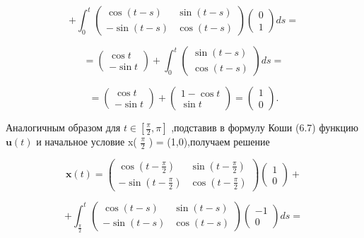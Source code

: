 \documentclass[8pt]{extarticle}
\begin{document}
\[
+ {\int }_{0}^{t}\left( \begin{array}{cc} \cos \left( {t - s}\right) & \sin \left( {t - s}\right) \\   - \sin \left( {t - s}\right) & \cos \left( {t - s}\right) \end{array}\right) \left( \begin{array}{l} 0 \\  1 \end{array}\right) {ds} =
\]

\[
= \left( \begin{array}{c} \cos t \\   - \sin t \end{array}\right)  + {\int }_{0}^{t}\left( \begin{array}{c} \sin \left( {t - s}\right) \\  \cos \left( {t - s}\right) \end{array}\right) {ds} =
\]

\[
= \left( \begin{array}{c} \cos t \\   - \sin t \end{array}\right)  + \left( \begin{array}{c} 1 - \cos t \\  \sin t \end{array}\right)  = \left( \begin{array}{l} 1 \\  0 \end{array}\right) .
\]

Аналогичным образом для \(t \in  \left\lbrack  {\frac{\pi }{2},\pi }\right\rbrack\) ,подставив в формулу Коши (6.7) функцию \(\mathbf{u}\left( t\right)\) и начальное условие x( \(\frac{\pi }{2}\) ) = (1,0),получаем решение

\[
\mathbf{x}\left( t\right)  = \left( \begin{array}{cc} \cos \left( {t - \frac{\pi }{2}}\right) & \sin \left( {t - \frac{\pi }{2}}\right) \\   - \sin \left( {t - \frac{\pi }{2}}\right) & \cos \left( {t - \frac{\pi }{2}}\right) \end{array}\right) \left( \begin{array}{l} 1 \\  0 \end{array}\right)  +
\]

\[
+ {\int }_{\frac{\pi }{2}}^{t}\left( \begin{array}{cc} \cos \left( {t - s}\right) & \sin \left( {t - s}\right) \\   - \sin \left( {t - s}\right) & \cos \left( {t - s}\right) \end{array}\right) \left( \begin{array}{c} - 1 \\  0 \end{array}\right) {ds} =
\]
\end{document}
